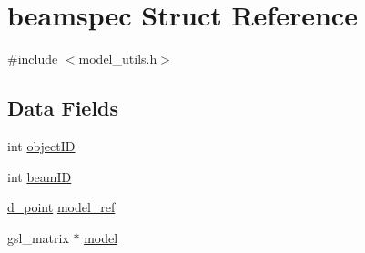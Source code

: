 \hypertarget{structbeamspec}{
\section{beamspec Struct Reference}
\label{structbeamspec}
}


{\ttfamily \#include $<$model\_\-utils.h$>$}\subsection*{Data Fields}
\begin{DoxyCompactItemize}
\item 
int \hyperlink{structbeamspec_ac47c161554a61fa65c4f5a744f761252}{objectID}
\item 
int \hyperlink{structbeamspec_a8185e83f23ffbab21ec47ec3d2bea13c}{beamID}
\item 
\hyperlink{structd__point}{d\_\-point} \hyperlink{structbeamspec_a4526cf634c09ad9fbd3f566dba8ea0fd}{model\_\-ref}
\item 
gsl\_\-matrix $\ast$ \hyperlink{structbeamspec_a5585f5d3885305e980e09fed9a79a618}{model}
\end{DoxyCompactItemize}


